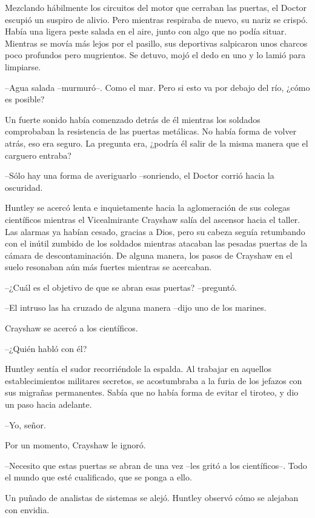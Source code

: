 {Mezclando hábilmente los circuitos del motor que cerraban las puertas,
 el Doctor escupió un suspiro de alivio. Pero mientras respiraba de
 nuevo, su nariz se crispó. Había una ligera peste salada en el aire,
 junto con algo que no podía situar. Mientras se movía más lejos por el
 pasillo, sus deportivas salpicaron unos charcos poco profundos pero
mugrientos. Se detuvo, mojó el dedo en uno y lo lamió para limpiarse.}

{--Agua salada --murmuró--. Como el mar. Pero si esto va por debajo del
río, ¿cómo es posible?}

{Un fuerte sonido había comenzado detrás de él mientras los soldados
 comprobaban la resistencia de las puertas metálicas. No había forma de
 volver atrás, eso era seguro. La pregunta era, ¿podría él salir de la
misma manera que el carguero entraba?}

{--Sólo hay una forma de averiguarlo --sonriendo, el Doctor corrió hacia
la oscuridad.}

\mbox{}

{Huntley se acercó lenta e inquietamente hacia la aglomeración de sus
 colegas científicos mientras el Vicealmirante Crayshaw salía del
 ascensor hacia el taller. Las alarmas ya habían cesado, gracias a Dios,
 pero su cabeza seguía retumbando con el inútil zumbido de los soldados
 mientras atacaban las pesadas puertas de la cámara de descontaminación.
 De alguna manera, los pasos de Crayshaw en el suelo resonaban aún más
fuertes mientras se acercaban.}

{--¿Cuál es el objetivo de que se abran esas puertas? --preguntó.}

{--El intruso las ha cruzado de alguna manera --dijo uno de los
marines.}

{Crayshaw se acercó a los científicos.}

{--¿Quién habló con él?}

{Huntley sentía el sudor recorriéndole la espalda. Al trabajar en
 aquellos establecimientos militares secretos, se acostumbraba a la furia
 de los jefazos con sus migrañas permanentes. Sabía que no había forma de
evitar el tiroteo, y dio un paso hacia adelante.}

{--Yo, señor.}

{Por un momento, Crayshaw le ignoró.}

{--Necesito que estas puertas se abran de una vez --les gritó a los
científicos--. Todo el mundo que esté cualificado, que se ponga a ello.}

{Un puñado de analistas de sistemas se alejó. Huntley observó cómo se
alejaban con envidia.}

